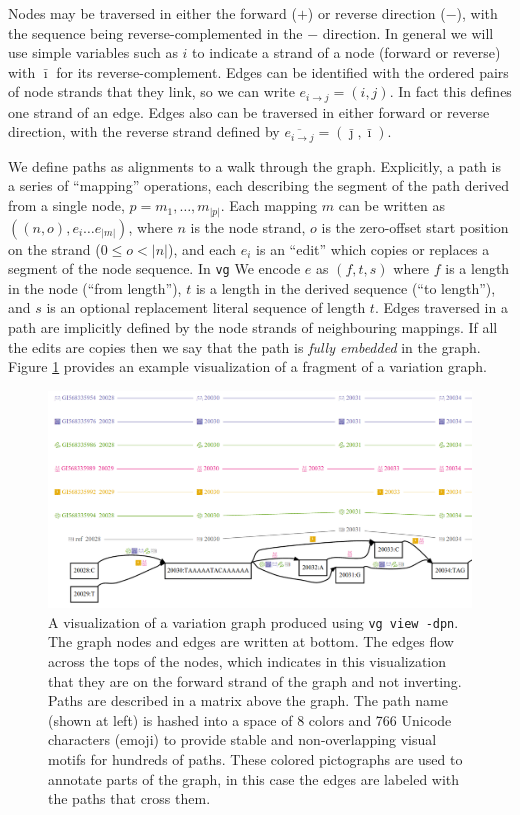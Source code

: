 \documentclass{article}
\begin{document}
Nodes may be traversed in either the forward ($+$) or reverse direction ($-$), with the sequence being reverse-complemented in the
$-$ direction.  In general we will use simple variables such as $i$ to indicate a strand of a node (forward or reverse) with $\bar \imath$
for its reverse-complement.  Edges can be identified with the ordered pairs of node strands that they link, so we can write
$e_{i \rightarrow j} = ( i, j ) $.  In fact this defines one strand of an edge.  Edges also can be traversed in either forward or
reverse direction, with the reverse strand defined by $\overline{e_{i \rightarrow j}} = (  {\bar \jmath}, {\bar \imath} )$.

We define paths as alignments to a walk through the graph.  Explicitly, a path is a series of ``mapping'' operations, each
describing the segment of the path derived from a single node, $p = m_1, \ldots, m_{|p|}$.  Each mapping $m$ can be written
as $( (n, o), e_i \ldots e_{|m|} )$, where $n$ is the node strand, $o$ is the zero-offset start position on the strand ($0 \le o < |n|$),
and each $e_i$ is an ``edit'' which copies or replaces a segment of the node sequence.  In {\tt vg} We encode $e$ as $(f, t, s)$
where $f$ is a length in the node (``from length''), $t$ is a length in the derived sequence (``to length''), and $s$ is an optional
replacement literal sequence of length $t$.  Edges traversed in a path are implicitly defined by the node strands of neighbouring mappings.
If all the edits are copies then we say that the path is {\em fully embedded} in the graph.
Figure \ref{fig:minimhc} provides an example visualization of a fragment of a variation graph.

\begin{figure}[t]
\centering
\includegraphics[width=1.0\textwidth]{figures/minimhc}
\caption{\label{fig:minimhc}
  A visualization of a variation graph produced using {\tt vg view -dpn}.
  The graph nodes and edges are written at bottom. The edges flow across the tops of the nodes, which indicates in this visualization that they are on the forward strand of the graph and not inverting.
  Paths are described in a matrix above the graph.
  The path name (shown at left) is hashed into a space of 8 colors and 766 Unicode characters (emoji) to provide stable and non-overlapping visual motifs for hundreds of paths.
  These colored pictographs are used to annotate parts of the graph, in this case the edges are labeled with the paths that cross them.
}
\end{figure}
\end{document}
